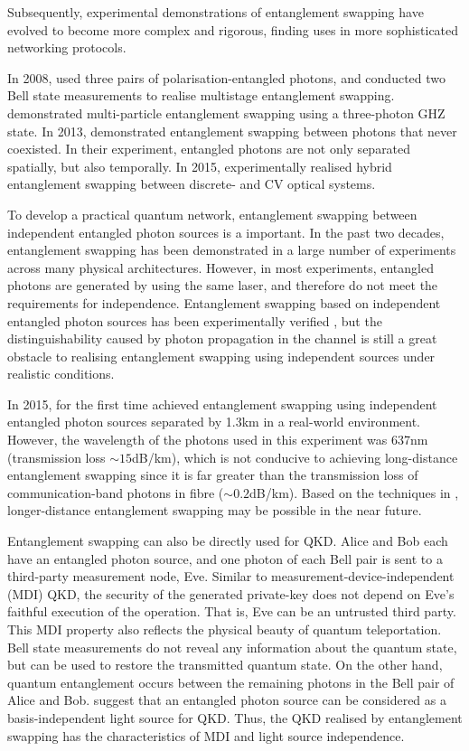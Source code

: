 Subsequently, experimental demonstrations of entanglement swapping have evolved to become more complex and rigorous, finding uses in more sophisticated networking protocols.

In 2008, \cite{bib:goebel08} used three pairs of polarisation-entangled photons, and conducted two Bell state measurements to realise multistage entanglement swapping. \cite{bib:PRL_103_020501} demonstrated multi-particle entanglement swapping using a three-photon GHZ state. In 2013, \cite{bib:PRL_110_210403} demonstrated entanglement swapping between photons that never coexisted. In their experiment, entangled photons are not only separated spatially, but also temporally. In 2015, \cite{bib:PRL_114_100501} experimentally realised hybrid entanglement swapping between discrete- and CV optical systems.

To develop a practical quantum network, entanglement swapping between independent entangled photon sources is a important. In the past two decades, entanglement swapping has been demonstrated in a large number of experiments across many physical architectures. However, in most experiments, entangled photons are generated by using the same laser, and therefore do not meet the requirements for independence. Entanglement swapping based on independent entangled photon sources has been experimentally verified \cite{bib:PRL_96_110501, bib:Nat_Phys_3_692, bib:PRA_79_040302}, but the distinguishability caused by photon propagation in the channel is still a great obstacle to realising entanglement swapping using independent sources under realistic conditions.

In 2015, \cite{bib:Nat_526_682} for the first time achieved entanglement swapping using independent entangled photon sources separated by 1.3km in a real-world environment. However, the wavelength of the photons used in this experiment was 637nm (transmission loss \mbox{$\sim 15$dB/km}), which is not conducive to achieving long-distance entanglement swapping since it is far greater than the transmission loss of communication-band photons in fibre (\mbox{$\sim 0.2$dB/km}). Based on the techniques in \cite{bib:sun2016quantum, bib:Nat_phot_10_676}, longer-distance entanglement swapping may be possible in the near future.

Entanglement swapping can also be directly used for QKD. Alice and Bob each have an entangled photon source, and one photon of each Bell pair is sent to a third-party measurement node, Eve. Similar to measurement-device-independent (MDI) QKD, the security of the generated private-key does not depend on Eve's faithful execution of the operation. That is, Eve can be an untrusted third party. This MDI property also reflects the physical beauty of quantum teleportation. Bell state measurements do not reveal any information about the quantum state, but can be used to restore the transmitted quantum state. On the other hand, quantum entanglement occurs between the remaining photons in the Bell pair of Alice and Bob. \cite{bib:PRL_90_057902, bib:NJP_10_2008} suggest that an entangled photon source can be considered as a basis-independent light source for QKD. Thus, the QKD realised by entanglement swapping has the characteristics of MDI and light source independence.

